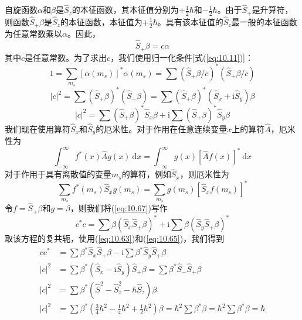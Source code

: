     自旋函数$\alpha$和$\beta$是$\hat{S}_z$的本征函数，其本征值分别为$+\frac{1}{2}\hbar$和$-\frac{1}{2}\hbar$。由于$\hat{S}_+$是升算符，则函数$\hat{S}_+\beta$是$\hat{S}_z$的本征函数，本征值为$+\frac{1}{2}\hbar$。具有该本征值的$\hat{S}_z$最一般的本征函数为任意常数乘以$\alpha$。因此，
    \begin{equation}
        \hat{S}_+\beta = c\alpha
        \label{eq:10.66}
    \end{equation}
    其中$c$是任意常数。为了求出$c$，我们使用归一化条件[式(\ref{eq:10.11})]：
    \begin{equation*}
        1 = \sum_{m_s} \left[\alpha\left(m_s\right)\right]^*\alpha\left(m_s\right) = \sum \left(\hat{S}_+\beta/c\right)^* \left(\hat{S}_+\beta/c\right)
    \end{equation*}
    \begin{equation*}
        \left|c\right|^2 = \sum \left(\hat{S}_+\beta\right) ^* \left(\hat{S}_+\beta\right) = \sum \left(\hat{S}_+\beta\right)^* \left(\hat{S}_x + \mathrm{i}\hat{S}_y\right)\beta
    \end{equation*}
    \begin{equation}
        \left|c\right|^2 = \sum \left(\hat{S}_+\beta\right)^* \hat{S}_x\beta + \mathrm{i} \sum \left(\hat{S}_+\beta\right)^* \hat{S}_y\beta
        \label{eq:10.67}
    \end{equation}
    我们现在使用算符$\hat{S}_x$和$\hat{S}_y$的厄米性。对于作用在任意连续变量$x$上的算符$\hat{A}$，厄米性为
    \begin{equation*}
        \int_{-\infty}^{\infty} f^*\left(x\right)\hat{A}g\left(x\right) \: \mathrm{d}x = \int_{-\infty}^{\infty} g\left(x\right) \left[\hat{A}f\left(x\right)\right]^* \: \mathrm{d}x
    \end{equation*}
    对于作用于具有离散值的变量$m_s$的算符，例如$\hat{S}_x$，则厄米性为
    \begin{equation}
        \sum_{m_s} f^*(m_s)\hat{S}_x g(m_s) = \sum_{m_s} g(m_s)\left[\hat{S}_x f(m_s)\right]^*
        \label{eq:10.68}
    \end{equation}
    令$f = \hat{S}_+\beta$和$g = \beta$，则我们将(\ref{eq:10.67})写作
    \begin{equation*}
        c ^* c = \sum \beta (\hat{S}_x\hat{S}_+ \beta) ^* + \mathrm{i} \sum \beta (\hat{S}_y\hat{S}_+ \beta)^*
    \end{equation*}
    取该方程的复共轭，使用(\ref{eq:10.63})和(\ref{eq:10.65})，我们得到
    \begin{equation*}
        \begin{aligned}
            cc^* &= \sum \beta ^* \hat{S}_x\hat{S}_+ \beta - \mathrm{i} \sum \beta ^* \hat{S}_y\hat{S}_+ \beta \\
            |c|^2 &= \sum \beta ^* \left(\hat{S}_x - \mathrm{i}\hat{S}_y  \right)\hat{S}_+\beta = \sum \beta ^* \hat{S}_-\hat{S}_+\beta \\
            |c|^2 &= \sum \beta ^* \left(\hat{S}^2 - \hat{S}_z^2 - \hbar\hat{S}_z  \right)\beta \\
            |c|^2 &= \sum \beta ^* \left(\frac{3}{4}\hbar^2 -\frac{1}{4}\hbar^2 + \frac{1}{2}\hbar^2  \right)\beta = \hbar^2 \sum \beta ^* \beta = \hbar^2 \sum \beta^* \beta = \hbar
        \end{aligned}
    \end{equation*}
